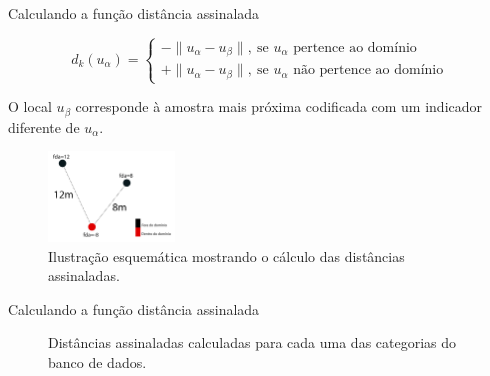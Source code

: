 \documentclass[aspectratio=169]{beamer}
\begin{document}
\begin{frame}{Calculando a função distância assinalada}

\begin{equation}
d_k(u_\alpha)=\begin{cases}
-\parallel u_\alpha-u_\beta\parallel,\:\textrm{se $u_\alpha$ pertence ao domínio}\\
+\parallel u_\alpha-u_\beta\parallel,\:\textrm{se $u_\alpha$ não pertence ao domínio}\end{cases}
\label{eq_mult_sg}
\end{equation}

O local $u_\beta$ corresponde à amostra mais próxima codificada com um indicador diferente de $u_\alpha$.
\begin{figure}[H]
	\caption{\label{2d_ex}Ilustração esquemática mostrando o cálculo das distâncias assinaladas.}
	\begin{center}
		\includegraphics[width=0.3\textwidth]{capitulo_2/2d_ex.jpg}
	\end{center}
\end{figure}
\end{frame}

\begin{frame}{Calculando a função distância assinalada} 
	\begin{figure}[H]
		\caption{Distâncias assinaladas calculadas para cada uma das categorias do banco de dados.} \label{indcalc}
		\centering
	\end{figure}
\end{frame}
\end{document}
